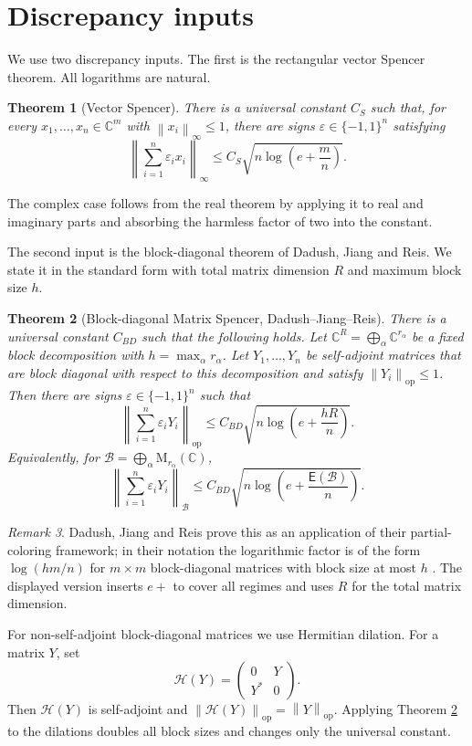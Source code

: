 \documentclass[11pt]{amsart}
\numberwithin{equation}{section}
\newtheorem{theorem}{Theorem}[section]
\theoremstyle{definition}
\theoremstyle{remark}
\newtheorem{remark}[theorem]{Remark}
\newcommand{\C}{\mathbb C}
\newcommand{\M}{\mathrm M}
\newcommand{\op}{\mathrm{op}}
\newcommand{\Ent}{\mathsf E}
\newcommand{\norm}[1]{\left\lVert #1\right\rVert}
\newcommand{\eps}{\varepsilon}
\newcommand{\mcB}{\mathcal B}
\begin{document}
\section{Discrepancy inputs}

We use two discrepancy inputs. The first is the rectangular vector Spencer
theorem. All logarithms are natural.

\begin{theorem}[Vector Spencer]\label{thm:vspencer}
There is a universal constant $C_S$ such that, for every
$x_1,\ldots,x_n\in\C^m$ with $\norm{x_i}_\infty\le 1$, there are signs
$\eps\in\{-1,1\}^n$ satisfying
\[
\norm{\sum_{i=1}^n \eps_i x_i}_\infty
\le C_S \sqrt{n\log\left(e+\frac{m}{n}\right)} .
\]
\end{theorem}

The complex case follows from the real theorem by applying it to real and
imaginary parts and absorbing the harmless factor of two into the constant.

The second input is the block-diagonal theorem of Dadush, Jiang and Reis. We
state it in the standard form with total matrix dimension $R$ and maximum block
size $h$.

\begin{theorem}[Block-diagonal Matrix Spencer, Dadush--Jiang--Reis]\label{thm:djr}
There is a universal constant $C_{BD}$ such that the following holds. Let
$\C^R=\bigoplus_\alpha \C^{r_\alpha}$ be a fixed block decomposition with
$h=\max_\alpha r_\alpha$. Let $Y_1,\ldots,Y_n$ be self-adjoint matrices that
are block diagonal with respect to this decomposition and satisfy
$\norm{Y_i}_{\op}\le 1$. Then there are signs $\eps\in\{-1,1\}^n$ such that
\[
\norm{\sum_{i=1}^n \eps_i Y_i}_{\op}
\le C_{BD}\sqrt{n\log\left(e+\frac{hR}{n}\right)} .
\]
Equivalently, for $\mcB=\bigoplus_\alpha \M_{r_\alpha}(\C)$,
\[
\norm{\sum_{i=1}^n \eps_i Y_i}_{\mcB}
\le C_{BD}\sqrt{n\log\left(e+\frac{\Ent(\mcB)}{n}\right)} .
\]
\end{theorem}

\begin{remark}
Dadush, Jiang and Reis prove this as an application of their partial-coloring
framework; in their notation the logarithmic factor is of the form
$\log(hm/n)$ for $m\times m$ block-diagonal matrices with block size at most
$h$ \cite{DJR}. The displayed version inserts $e+$ to cover all regimes and
uses $R$ for the total matrix dimension.
\end{remark}

For non-self-adjoint block-diagonal matrices we use Hermitian dilation. For a
matrix $Y$, set
\[
\mathscr H(Y)=\begin{pmatrix}0&Y\\Y^*&0\end{pmatrix} .
\]
Then $\mathscr H(Y)$ is self-adjoint and $\norm{\mathscr H(Y)}_{\op}=\norm{Y}_{\op}$.
Applying Theorem \ref{thm:djr} to the dilations doubles all block sizes
and changes only the universal constant.
\end{document}
